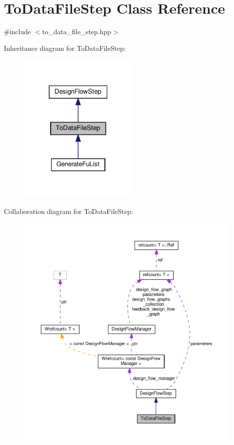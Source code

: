 \hypertarget{classToDataFileStep}{}\section{To\+Data\+File\+Step Class Reference}
\label{classToDataFileStep}


{\ttfamily \#include $<$to\+\_\+data\+\_\+file\+\_\+step.\+hpp$>$}



Inheritance diagram for To\+Data\+File\+Step\+:
\nopagebreak
\begin{figure}[H]
\begin{center}
\leavevmode
\includegraphics[width=169pt]{d1/d0d/classToDataFileStep__inherit__graph}
\end{center}
\end{figure}


Collaboration diagram for To\+Data\+File\+Step\+:
\nopagebreak
\begin{figure}[H]
\begin{center}
\leavevmode
\includegraphics[width=350pt]{df/dfd/classToDataFileStep__coll__graph}
\end{center}
\end{figure}
